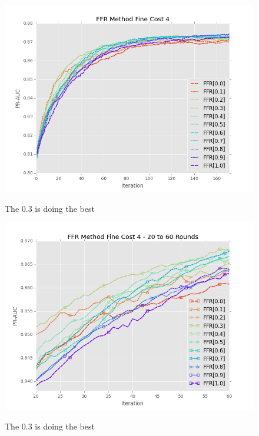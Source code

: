 \documentclass[ms]{nuthesis}
\begin{document}
\FloatBarrier
\begin{figure}[!htb]
	\centering
    \includegraphics[width=1.0\columnwidth]{fig/FFR_PR_Cost4_rnds0_171}
    \label{fig:FFR_PR_Cost4_rnds0_171}
    \caption{The 0.3 is doing the best}
\end{figure}
\FloatBarrier


\FloatBarrier
\begin{figure}[!htb]
	\centering
    \includegraphics[width=1.0\columnwidth]{fig/FFR_PR_Cost4_rnds20_60}
    \label{fig:FFR_PR_Cost4_rnds20_60}
    \caption{The 0.3 is doing the best}
\end{figure}
\FloatBarrier
\end{document}
